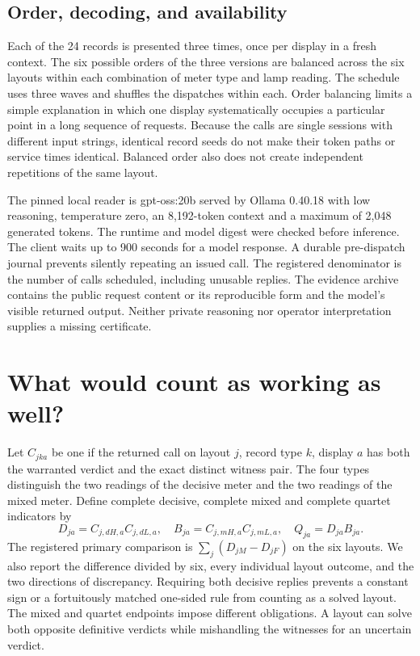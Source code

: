 \documentclass[12pt,letterpaper]{article}
\begin{document}
\subsection{Order, decoding, and availability}

Each of the 24 records is presented three times, once per display in a fresh context. The six possible orders of the three versions are balanced across the six layouts within each combination of meter type and lamp reading. The schedule uses three waves and shuffles the dispatches within each. Order balancing limits a simple explanation in which one display systematically occupies a particular point in a long sequence of requests. Because the calls are single sessions with different input strings, identical record seeds do not make their token paths or service times identical. Balanced order also does not create independent repetitions of the same layout.

The pinned local reader is gpt-oss:20b served by Ollama 0.40.18 with low reasoning, temperature zero, an 8,192-token context and a maximum of 2,048 generated tokens. The runtime and model digest were checked before inference. The client waits up to 900 seconds for a model response. A durable pre-dispatch journal prevents silently repeating an issued call. The registered denominator is the number of calls scheduled, including unusable replies. The evidence archive contains the public request content or its reproducible form and the model's visible returned output. Neither private reasoning nor operator interpretation supplies a missing certificate.


\section{What would count as working as well?}

Let $C_{jka}$ be one if the returned call on layout $j$, record type $k$, display $a$ has both the warranted verdict and the exact distinct witness pair. The four types distinguish the two readings of the decisive meter and the two readings of the mixed meter. Define complete decisive, complete mixed and complete quartet indicators by
\[
 D_{ja}=C_{j,dH,a}C_{j,dL,a},\quad
 B_{ja}=C_{j,mH,a}C_{j,mL,a},\quad
 Q_{ja}=D_{ja}B_{ja}.
\]
The registered primary comparison is $\sum_j (D_{jM}-D_{jF})$ on the six layouts. We also report the difference divided by six, every individual layout outcome, and the two directions of discrepancy. Requiring both decisive replies prevents a constant sign or a fortuitously matched one-sided rule from counting as a solved layout. The mixed and quartet endpoints impose different obligations. A layout can solve both opposite definitive verdicts while mishandling the witnesses for an uncertain verdict.
\end{document}
